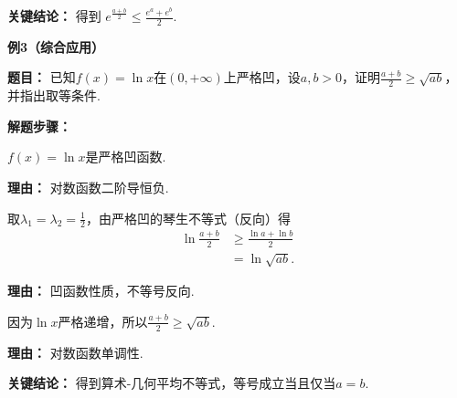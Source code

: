 \begin{examplebox}
	\textbf{\textcolor{CExample}{关键结论：}}
	得到 $e^{\frac{a+b}{2}}\le\frac{e^a+e^b}{2}$.

	\medskip
	\textbf{\textcolor{CExample}{例3（综合应用）}}

	\textbf{\textcolor{CExample}{题目：}}
	已知$f(x)=\ln x$在$(0,+\infty)$上严格凹，设$a,b>0$，证明$\frac{a+b}{2}\ge\sqrt{ab}$，并指出取等条件.

	\textbf{\textcolor{CExample}{解题步骤：}}
	\begin{description}[style=nextline, leftmargin=2.8em, labelsep=0.5em, itemsep=0.45em]
		\item[\textbf{第一步（判定凹性）：}] $f(x)=\ln x$是严格凹函数.
			\par\textbf{理由：} 对数函数二阶导恒负.
		\item[\textbf{第二步（套用公式）：}] 取$\lambda_1=\lambda_2=\frac12$，由严格凹的琴生不等式（反向）得
			\[
				\begin{aligned}
					\ln\frac{a+b}{2} &\ge \frac{\ln a+\ln b}{2} \\
					&= \ln\sqrt{ab}.
			\end{aligned}
			\]
			\par\textbf{理由：} 凹函数性质，不等号反向.
		\item[\textbf{第三步（化简结论）：}] 因为$\ln x$严格递增，所以$\frac{a+b}{2}\ge\sqrt{ab}$.
			\par\textbf{理由：} 对数函数单调性.
	\end{description}

	\textbf{\textcolor{CExample}{关键结论：}}
	得到算术-几何平均不等式，等号成立当且仅当$a=b$.
\end{examplebox}
